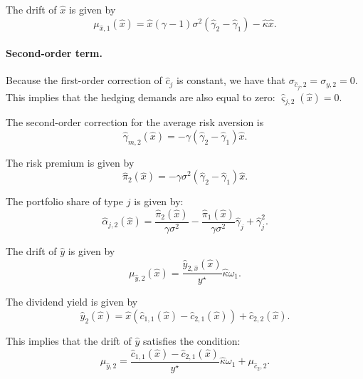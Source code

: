 \documentclass[11pt,english]{article}
\begin{document}
The drift of $\hat{x}$ is given by
\begin{equation}
    \mu_{\hat{x},1}(\hat{x}) = \hat{x} (\gamma-1) \sigma^2 (\hat{\gamma}_2-\hat{\gamma}_1) - \hat{\kappa} \hat{x}.
\end{equation}

\paragraph{Second-order term.} Because the first-order correction of $\hat{c}_{j}$ is constant, we have that $\sigma_{\hat{c}_j,2} = \sigma_{y,2}=  0$. 
This implies that the hedging demands are also equal to zero: $\hat{\varsigma}_{j,2}(\hat{x})=0$.

The second-order correction for the average risk aversion is
\begin{equation}
    \hat{\gamma}_{m,2}(\hat{x}) = -\gamma (\hat{\gamma}_2-\hat{\gamma}_1) \hat{x}.
\end{equation}

The risk premium is given by
\begin{equation}
    \hat{\pi}_2(\hat{x}) = -\gamma \sigma^2(\hat{\gamma}_2-\hat{\gamma}_1) \hat{x}. 
\end{equation}

The portfolio share of type $j$ is given by:
\begin{equation}
    \hat{\alpha}_{j,2}(\hat{x}) = \frac{\hat{\pi}_2(\hat{x})}{\gamma \sigma^2} - \frac{\hat{\pi}_1(\hat{x})}{\gamma \sigma^2} \hat{\gamma}_j + \hat{\gamma}_{j}^2.
\end{equation}

The drift of $\hat{y}$ is given by
\begin{equation}
    \mu_{\hat{y},2}(\hat{x}) = \frac{\hat{y}_{2,\hat{x}}(\hat{x})}{y^\star} \hat{\kappa} \omega_1.
\end{equation}

The dividend yield is given by
\begin{equation}
    \hat{y}_2(\hat{x}) = \hat{x} (\hat{c}_{1,1}(\hat{x})-\hat{c}_{2,1}(\hat{x})) + \hat{c}_{2,2}(\hat{x}).
\end{equation}

This implies that the drift of $\hat{y}$ satisfies the condition:
\begin{equation}
    \mu_{\hat{y},2} = \frac{\hat{c}_{1,1}(\hat{x})-\hat{c}_{2,1}(\hat{x})}{y^\star} \hat{\kappa} \omega_1 +\mu_{\hat{c}_2,2}.
\end{equation}
\end{document}
